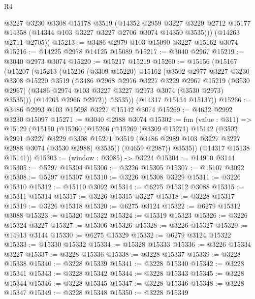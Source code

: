 \begin{lexlean}{R4}
\begin{coremodule}
        @3227
        @3230
        @3308
        @15178
        @3519
        (@14352
          @2959
          @3227
          @3229
          @2712
          @15177
          @14358
          (@14344 @103 @3227 @3227 @2706 @3074 @14350 @3535)))
      (@14263 @2711 @2705))
@15213 := @3486 @2979 @103 @15090 @3227 @15162 @3074
@15216 := @14225 @2978 @14125 @15089
@15217 := @3040 @2967
@15219 := @3040 @2973 @3074
@15220 := @15217 @15219
@15260 := @15156
    (@15167
      (@15207
        (@15213
          (@15216
            (@3309 @15220)
            @15162
            (@3502
              @2977
              @3227
              @3230
              @3308
              @15220
              @3519
              (@3486
                @2968
                @2976
                @3227
                @3229
                @2967
                @15219
                (@3530 @2967)
                (@3486 @2974 @103 @3227 @3227 @2973 @3074 (@3530 @2973) @3535)))
            (@14263 @2966 @2972))
          @3535))
      (@14317 @15134 @15137))
@15266 := @3486 @2993 @103 @15098 @3227 @15142 @3074
@15269 := @4632 @2992 @3230 @15097
@15271 := @3040 @2988 @3074
@15302 := fun (value : @311) =>
  @15129
    (@15150
      (@15260
        (@15266
          (@15269
            (@3309 @15271)
            @15142
            (@3502
              @2991
              @3227
              @3229
              @3308
              @15271
              @3519
              (@3486 @2989 @103 @3227 @3227 @2988 @3074 (@3530 @2988) @3535))
            (@4659 @2987))
          @3535))
      (@14317 @15138 @15141))
@15303 := (window : @3085) -> @3224
@15304 := @14910 @3144
@15305 := @5297 @15304
@15306 := @3226 @15305
@15307 := @15107 @3092
@15308 := @5297 @15307
@15310 := @3226 @15308 @3229
@15311 := @3226 @15310
@15312 := @15110 @3092
@15314 := @6275 @15312 @3088
@15315 := @15311 @15314
@15317 := @3226 @15315 @3227
@15318 := @3228 @15317
@15319 := @3226 @15318
@15320 := @6275 @3124
@15322 := @6279 @15312 @3088
@15323 := @15320 @15322
@15324 := @15319 @15323
@15326 := @3226 @15324 @3227
@15327 := @15306 @15326
@15328 := @3226 @15327
@15329 := @14913 @3144
@15330 := @6275 @15329
@15332 := @6279 @3124 @15322
@15333 := @15330 @15332
@15334 := @15328 @15333
@15336 := @3226 @15334 @3227
@15337 := @3228 @15336
@15338 := @3228 @15337
@15339 := @3228 @15338
@15340 := @3228 @15339
@15341 := @3228 @15340
@15342 := @3228 @15341
@15343 := @3228 @15342
@15344 := @3228 @15343
@15345 := @3228 @15344
@15346 := @3228 @15345
@15347 := @3228 @15346
@15348 := @3228 @15347
@15349 := @3228 @15348
@15350 := @3228 @15349

\end{coremodule}
\end{lexlean}

